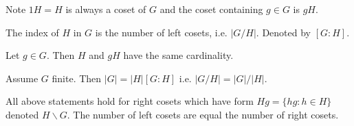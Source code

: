 Note \(1H = H\) is always a coset of \(G\) and the coset containing \(g \in G\) is \(gH\).


\begin{definition}[Index]
    The index of \(H\) in \(G\) is the number of left cosets, i.e. \(|G/H|\). Denoted by \([G:H]\).
\end{definition}

\begin{lemma} \label{coset-cardinality-lemma}
    Let \(g \in G\). Then \(H\) and \(gH\) have the same cardinality.
\end{lemma}

\begin{theorem}
    Assume \(G\) finite. Then \(|G| = |H|[G:H]\) i.e. \(|G/H| = |G| / |H|\).
\end{theorem}


\bigskip
All above statements hold for right cosets which have form \(Hg = \{hg : h \in H\}\) denoted \(H \backslash G\). The number of left cosets are equal the number of right cosets.
